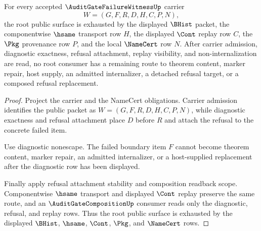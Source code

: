 \begin{theorem}
\label{thm:audit-gate-failure-witness-root-public-exhaustion}
For every accepted $\AuditGateFailureWitnessUp$ carrier
$$
W=(G,F,R,D,H,C,P,N),
$$
the root public surface is exhausted by the displayed $\BHist$ packet, the componentwise $\hsame$ transport row $H$, the displayed $\Cont$ replay row $C$, the $\Pkg$ provenance row $P$, and the local $\NameCert$ row $N$. After carrier admission, diagnostic exactness, refusal attachment, replay visibility, and non-internalization are read, no root consumer has a remaining route to theorem content, marker repair, host supply, an admitted internalizer, a detached refusal target, or a composed refusal replacement.
\end{theorem}
\begin{proof}
Project the carrier and the NameCert obligations. Carrier admission identifies the public packet as $W=(G,F,R,D,H,C,P,N)$, while diagnostic exactness and refusal attachment place $D$ before $R$ and attach the refusal to the concrete failed item.

Use diagnostic nonescape. The failed boundary item $F$ cannot become theorem content, marker repair, an admitted internalizer, or a host-supplied replacement after the diagnostic row has been displayed.

Finally apply refusal attachment stability and composition readback scope. Componentwise $\hsame$ transport and displayed $\Cont$ replay preserve the same route, and an $\AuditGateCompositionUp$ consumer reads only the diagnostic, refusal, and replay rows. Thus the root public surface is exhausted by the displayed $\BHist$, $\hsame$, $\Cont$, $\Pkg$, and $\NameCert$ rows.
\end{proof}

